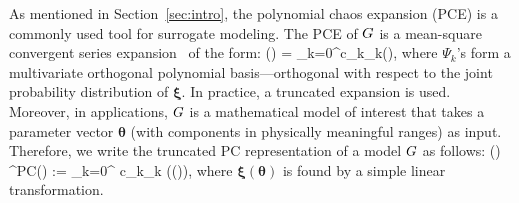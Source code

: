 

As mentioned in Section~\ref{sec:intro}, the 
polynomial chaos expansion
(PCE) is a commonly used tool for surrogate modeling. 
The PCE of
$G$ is a mean-square 
convergent series expansion~\cite{Xiu:2002,Ghanem:2003,Olivier:2010} of the form:
\be
\GG(\bm\xi) = \sum_{k=0}^\infty c_k\Psi_k(\bm{\xi}),
\ee
where $\Psi_k$'s form a multivariate orthogonal polynomial
basis---orthogonal with respect to the joint probability distribution of $\bm{\xi}$.
%
In practice, a truncated expansion is used.  Moreover, in applications, $G$
is a mathematical model of interest that takes a parameter vector $\bm{\theta}$
(with components in physically meaningful ranges) as input. Therefore, we 
write the truncated PC representation of a model $G$ as follows:
\be 
\GG(\bm\theta) \approx \GG^{\mbox{\tiny PC}}(\bm\theta) := \sum_{k=0}^{\Npc}
c_k\Psi_k (\bm\xi(\bm\theta)), 
\ee
where $\bm\xi(\bm\theta)$ is found by a simple linear transformation.

